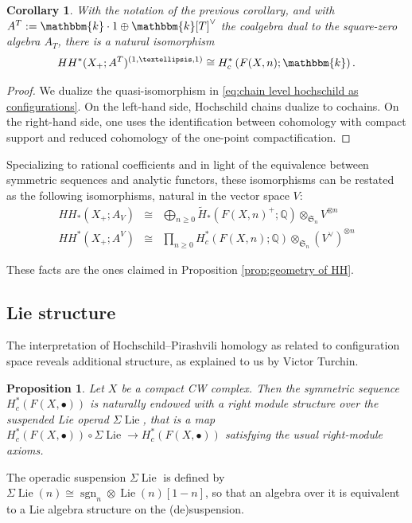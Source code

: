 \documentclass[12pt]{article}
\newcommand{\Q}{\mathbb{Q}}
\newcommand{\kk}{\mathbbm{k}}
\newcommand{\SymGroup}[1][n]{\mathfrak{S}_{#1}}
\newcommand{\OperSuspension}{\Sigma}
\newcommand{\sgn}[1][n]{\operatorname{sgn}_{#1}}
\DeclareMathOperator{\Lie}{Lie}
\theoremstyle{plain}
\newtheorem{prop}[thm]{Proposition}
\newtheorem{cor}[thm]{Corollary}
\theoremstyle{definition}
\theoremstyle{remark}
\begin{document}

\begin{cor}
With the notation of the previous corollary, and with $A^T:= \kk\cdot 1 \oplus \kk[T]^\vee$ the coalgebra dual to the square-zero algebra $A_T$,
there is a natural isomorphism
\begin{equation}\label{eq:iso-Hochschild-cohom}
    HH^*(X_+; A^T )^{(1,\ldots,1)} \cong H^{*}_c\left( F(X,n) ; \kk\right).
\end{equation}
\end{cor}

\begin{proof}
We dualize the quasi-isomorphism in \eqref{eq:chain level hochschild as configurations}. On the left-hand side, Hochschild chains dualize to cochains.  %
On the right-hand side, one uses the identification between cohomology with compact support and reduced cohomology of the one-point compactification.
\end{proof}

Specializing to rational coefficients and in light of the equivalence between symmetric sequences and analytic functors, these isomorphisms can be restated as the following isomorphisms, natural in the vector space $V$:
\begin{eqnarray} \label{eq:HH lower star}
    HH_{\ast}(X_+; A_V) & \cong & \bigoplus_{n\geq 0}{\tilde{H}_{\ast}(F(X, n)^+; \Q)\otimes_{\SymGroup}V^{\otimes n}}\\ \label{eq:HH upper star}
    HH^{\ast}(X_+; A^V) & \cong & \prod_{n\geq 0}{H_c^{\ast}(F(X, n); \Q)\otimes_{\SymGroup}(V^\vee)^{\otimes n}}
\end{eqnarray}

These facts are the ones claimed in Proposition \ref{prop:geometry of HH}.

\subsection{Lie structure}\label{sec:lie structure}

The interpretation of Hochschild--Pirashvili homology as related to configuration space reveals additional structure, as explained to us by Victor Turchin. %
\begin{prop}
    Let $X$ be a compact CW complex. Then the symmetric sequence $H^*_c(F(X,\bullet))$ is naturally endowed with a right module structure over the suspended Lie operad $\OperSuspension\Lie$, that is a map $H^*_c(F(X,\bullet)) \circ \OperSuspension\Lie \to H^*_c(F(X,\bullet))$ satisfying the usual right-module axioms.
\end{prop}
The operadic suspension $\OperSuspension\Lie$ is defined by $\OperSuspension\Lie(n) \cong \sgn[n]\otimes\Lie(n)[1-n]$, so that an algebra over it is equivalent to a Lie algebra structure on the (de)suspension.
\end{document}
